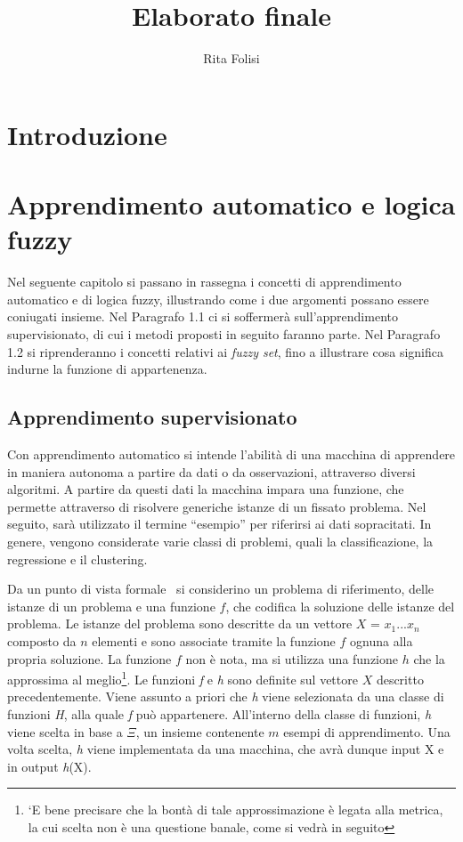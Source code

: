 \documentclass[11pt,  oneside, openany]{book}
\title{Elaborato finale}
\date{}
\author{Rita Folisi}
\begin{document}

  \begin{titlepage}
    
    \tableofcontents
    \thispagestyle{empty}
  \end{titlepage}




	\chapter*{Introduzione}

	\chapter{Apprendimento automatico e logica fuzzy}
Nel seguente capitolo si passano in rassegna i concetti di apprendimento automatico e di logica fuzzy, illustrando come i due argomenti possano essere coniugati insieme. Nel Paragrafo 1.1 ci si soffermerà sull'apprendimento supervisionato, di cui i metodi proposti in seguito faranno parte. Nel Paragrafo 1.2 si riprenderanno i concetti relativi ai \textit {fuzzy set}, fino a illustrare cosa significa indurne la funzione di appartenenza. 

	\section{Apprendimento supervisionato}

Con apprendimento automatico si intende l'abilità di una macchina di apprendere in maniera autonoma a partire da dati o da osservazioni, attraverso diversi algoritmi. A partire da questi dati la macchina impara una funzione, che permette attraverso di risolvere generiche istanze di un fissato problema. Nel seguito, sarà utilizzato il termine ``esempio'' per riferirsi ai dati sopracitati. In genere, vengono considerate varie classi di problemi, quali la classificazione, la regressione e il clustering. 

Da un punto di vista formale~\cite {mlstanford} si considerino un problema di riferimento, delle istanze di un problema e una funzione  $f$, che codifica la soluzione delle istanze del problema. Le istanze del problema sono descritte da un vettore  $X$ = $x_1...x_n$ composto da $n$ elementi e sono associate tramite la funzione $f$ ognuna alla propria soluzione. La funzione $f$ non è nota, ma si utilizza una funzione $h$ che la approssima al meglio\footnote{`E bene precisare che la bontà di tale approssimazione è legata alla metrica, la cui scelta non è una questione banale, come si vedrà in seguito}.  Le funzioni \textit {f} e \textit {h} sono definite sul vettore $X$ descritto precedentemente. Viene assunto a priori che \textit {h} viene selezionata da una classe di funzioni \textit {H}, alla quale \textit {f} può appartenere.  All'interno della classe di funzioni, \textit {h} viene scelta in base a $\Xi$, un insieme contenente $m$ esempi di apprendimento. Una volta scelta, \textit {h} viene implementata da una macchina, che avrà dunque input X e in output \textit {h}(X). 
\end{document}
